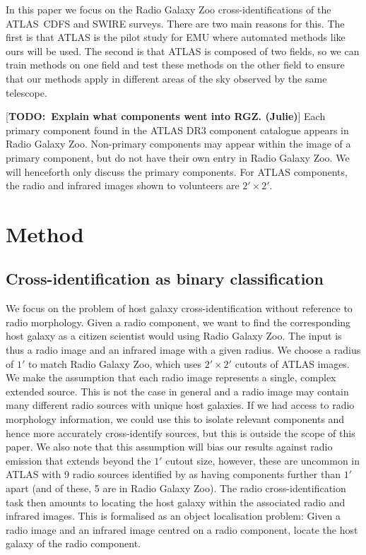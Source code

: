 \documentclass[fleqn,usenatbib,usedcolumn]{mnras}
\newcommand{\todo}[1]{ {\color{red}[{\bf TODO:~{#1}}]} }
\begin{document}
    In this paper we focus on the Radio Galaxy Zoo cross-identifications of
    the ATLAS~CDFS and SWIRE surveys. There are two main reasons for this. The
    first is that ATLAS is the pilot study for EMU where automated methods
    like ours will be used. The second is that ATLAS is composed of two
    fields, so we can train methods on one field and test these methods on
    the other field to ensure that our methods apply in different areas of
    the sky observed by the same telescope.

    \todo{Explain what components went into RGZ. (Julie)} Each primary component
    found in the ATLAS DR3 component catalogue appears in Radio Galaxy Zoo.
    Non-primary components may appear within the image of a primary component,
    but do not have their own entry in Radio Galaxy Zoo. We will henceforth only
    discuss the primary components. For ATLAS components, the radio and infrared
    images shown to volunteers are \(2' \times 2'\).

  \section{Method}\label{method}

  \subsection{Cross-identification as binary
  classification}\label{cross-identification-as-binary-classification}

    We focus on the problem of host galaxy cross-identification without
    reference to radio morphology. Given a radio component, we want to find the
    corresponding host galaxy as a citizen scientist would using Radio Galaxy
    Zoo. The input is thus a radio image and an infrared image with a given
    radius. We choose a radius of $1'$ to match Radio Galaxy Zoo, which uses $2'
    \times 2'$ cutouts of ATLAS images. We make the assumption that each radio
    image represents a single, complex extended source. This is not the case in
    general and a radio image may contain many different radio sources with
    unique host galaxies. If we had access to radio morphology information, we
    could use this to isolate relevant components and hence more accurately
    cross-identify sources, but this is outside the scope of this paper. We also
    note that this assumption will bias our results against radio emission that
    extends beyond the $1'$ cutout size, however, these are uncommon in ATLAS
    with 9 radio sources identified by \citet{norris06} as having components
    further than $1'$ apart (and of these, 5 are in Radio Galaxy Zoo). The radio
    cross-identification task then amounts to locating the host galaxy within
    the associated radio and infrared images. This is formalised as an object
    localisation problem: Given a radio image and an infrared image centred on a
    radio component, locate the host galaxy of the radio component.
\end{document}
